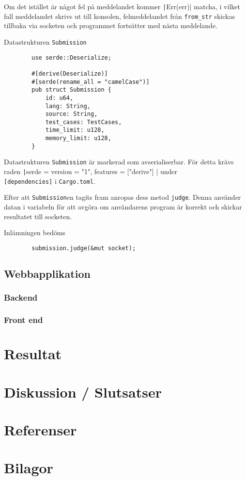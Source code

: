 \documentclass{article}
\begin{document}
Om det istället är något fel på meddelandet kommer \texttt|Err(err)|
matcha, i vilket fall meddelandet skrivs ut till konsolen, felmeddelandet från
\texttt{from\_str} skickas tillbaka via socketen och programmet fortsätter med
nästa meddelande.

\begin{listing}[H]
	\caption{Datastrukturen \texttt{Submission}}
	\begin{verbatim}
		use serde::Deserialize;

		#[derive(Deserialize)]
		#[serde(rename_all = "camelCase")]
		pub struct Submission {
			id: u64,
			lang: String,
			source: String,
			test_cases: TestCases,
			time_limit: u128,
			memory_limit: u128,
		}
	\end{verbatim}
\end{listing}

Datastrukturen \texttt{Submission} är markerad som avserialiserbar. För detta
krävs raden \texttt|serde = { version = "1", features = ["derive"] }|
under \\ \texttt{[dependencies]} i \texttt{Cargo.toml}.

Efter att \texttt{Submission}en tagits fram anropas dess metod \texttt{judge}.
Denna använder datan i variabeln för att avgöra om användarens program är
korrekt och skickar resultatet till socketen.

\begin{listing}[H]
	\caption{Inlämningen bedöms}
	\begin{verbatim}
        submission.judge(&mut socket);
	\end{verbatim}
\end{listing}

\subsection{Webbapplikation}

\subsubsection{Backend}
\label{webbserver}

\subsubsection{Front end}

\section{Resultat}

\section{Diskussion / Slutsatser}

\section{Referenser}

\section{Bilagor}
\end{document}
